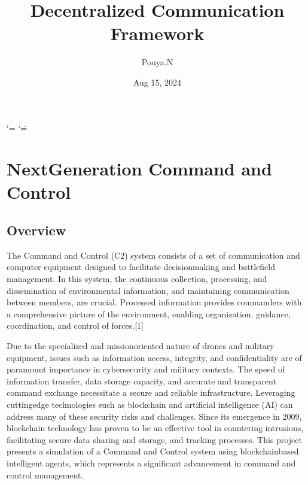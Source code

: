 \documentclass[letterpaper,10pt,english]{sphinxmanual}
\title{Decentralized Communication Framework}
\date{Aug 15, 2024}
\author{Pouya.N}
\let\sphinxpxdimen\pdfpxdimen\else\newdimen\sphinxpxdimen
\begin{document}
\ifdefined\shorthandoff
  \ifnum\catcode`\=\string=\active\shorthandoff{=}\fi
  \ifnum\catcode`\"=\active{}\fi
\fi

\pagestyle{empty}
\sphinxmaketitle
\pagestyle{plain}
\sphinxtableofcontents
\pagestyle{normal}
\label{\detokenize{index::doc}}


\sphinxstepscope


\chapter{Next\sphinxhyphen{}Generation Command and Control}
\label{\detokenize{overview:next-generation-command-and-control}}\label{\detokenize{overview::doc}}

\section{Overview}
\label{\detokenize{overview:overview}}
\sphinxAtStartPar
The Command and Control (C2) system consists of a set of communication and computer equipment designed to facilitate decision\sphinxhyphen{}making and battlefield management. In this system, the continuous collection, processing, and dissemination of environmental information, and maintaining communication between members, are crucial. Processed information provides commanders with a comprehensive picture of the environment, enabling organization, guidance, coordination, and control of forces.{[}1{]}

\noindent{\hspace*{\fill}\sphinxincludegraphics[width=600\sphinxpxdimen]{{_static/albertQube}.jpg}\hspace*{\fill}}

\sphinxAtStartPar
Due to the specialized and mission\sphinxhyphen{}oriented nature of drones and military equipment, issues such as information access, integrity, and confidentiality are of paramount importance in cybersecurity and military contexts. The speed of information transfer, data storage capacity, and accurate and transparent command exchange necessitate a secure and reliable infrastructure. Leveraging cutting\sphinxhyphen{}edge technologies such as blockchain and artificial intelligence (AI) can address many of these security risks and challenges. Since its emergence in 2009, blockchain technology has proven to be an effective tool in countering intrusions, facilitating secure data sharing and storage, and tracking processes. This project presents a simulation of a Command and Control system using blockchain\sphinxhyphen{}based intelligent agents, which represents a significant advancement in command and control management.
\end{document}
